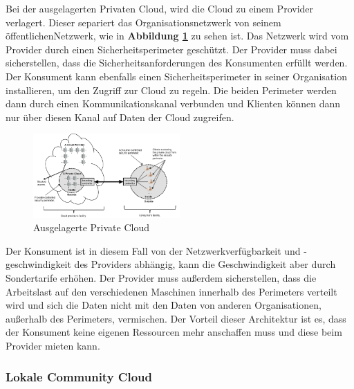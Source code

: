 Bei der ausgelagerten Privaten Cloud, wird die Cloud zu einem Provider verlagert. Dieser separiert das Organisationsnetzwerk
von seinem \glqq öffentlichen\grqq{}Netzwerk, wie in \textbf{Abbildung \ref{OutSourcedPrivateCloud}} zu sehen ist. Das Netzwerk wird vom Provider
durch einen Sicherheitsperimeter geschützt. Der Provider muss dabei sicherstellen, dass die Sicherheitsanforderungen des Konsumenten erfüllt werden. 
Der Konsument kann ebenfalls einen Sicherheitsperimeter in seiner Organisation installieren, um den Zugriff zur Cloud zu regeln.
Die beiden Perimeter werden dann durch einen Kommunikationskanal verbunden und Klienten können dann nur über diesen Kanal auf Daten der Cloud zugreifen.
\begin{figure}[h]
    \centering
	\includegraphics[width=0.5\textwidth]{Images/OutSourcedPrivateCloud}
	\caption{Ausgelagerte Private Cloud \cite{Badger}}
	\label{OutSourcedPrivateCloud}
\end{figure}
Der Konsument ist in diesem Fall von der Netzwerkverfügbarkeit und -geschwindigkeit des Providers abhängig, kann die Geschwindigkeit aber durch Sondertarife erhöhen.
Der Provider muss außerdem sicherstellen, dass die Arbeitslast auf den verschiedenen Maschinen innerhalb des Perimeters verteilt wird und sich die Daten 
nicht mit den Daten von anderen Organisationen, außerhalb des Perimeters, vermischen.
Der Vorteil dieser Architektur ist es, dass der Konsument keine eigenen Ressourcen mehr anschaffen muss und diese beim Provider mieten kann\cite{Badger}.

\subsubsection{Lokale Community Cloud}

